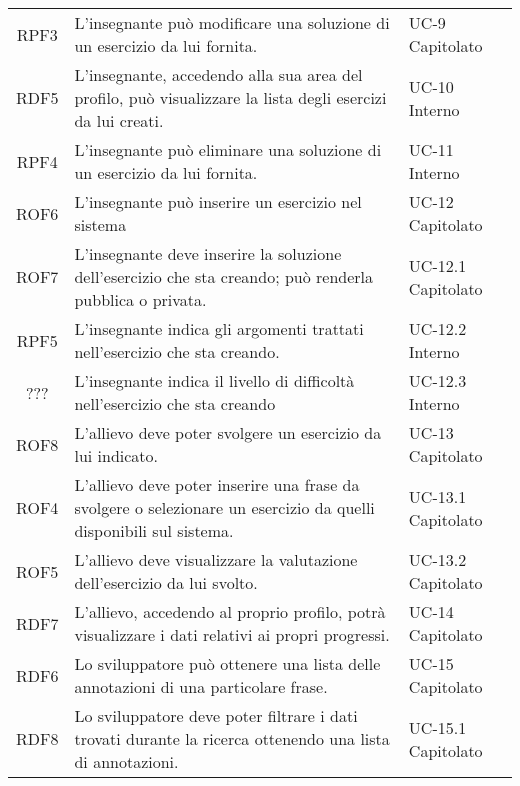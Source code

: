 \begin{tabularx}{\textwidth}{| c | p{10cm} | X |}
		RPF3 & L'insegnante può modificare una soluzione di un esercizio da lui fornita. & UC-9 \newline Capitolato\\
		RDF5 & L'insegnante, accedendo alla sua area del profilo, può visualizzare la lista degli esercizi da lui creati. & UC-10 \newline Interno\\
		RPF4 & L'insegnante può eliminare una soluzione di un esercizio da lui fornita. & UC-11 \newline Interno\\
		ROF6 & L'insegnante può inserire un esercizio nel sistema & UC-12 \newline Capitolato\\
		ROF7 & L'insegnante deve inserire la soluzione dell'esercizio che sta creando; può renderla pubblica o privata. & UC-12.1 \newline Capitolato\\
		RPF5 & L'insegnante indica gli argomenti trattati nell'esercizio che sta creando. & UC-12.2 \newline Interno\\
		??? & L'insegnante indica il livello di difficoltà nell'esercizio che sta creando & UC-12.3 \newline Interno\\
		ROF8 & L'allievo deve poter svolgere un esercizio da lui indicato. & UC-13 \newline Capitolato\\
		ROF4 & L'allievo deve poter inserire una frase da svolgere o selezionare un esercizio da quelli disponibili sul sistema. & UC-13.1 \newline Capitolato\\
		ROF5 & L'allievo deve visualizzare la valutazione dell'esercizio da lui svolto. & UC-13.2 \newline Capitolato\\
		RDF7 & L'allievo, accedendo al proprio profilo, potrà visualizzare i dati relativi ai propri progressi. & UC-14 \newline Capitolato\\
		RDF6 & Lo sviluppatore può ottenere una lista delle annotazioni di una particolare frase. & UC-15 \newline Capitolato\\
		RDF8 & Lo sviluppatore deve poter filtrare i dati trovati durante la ricerca ottenendo una lista di annotazioni. & UC-15.1 \newline Capitolato\\

\end{tabularx}
